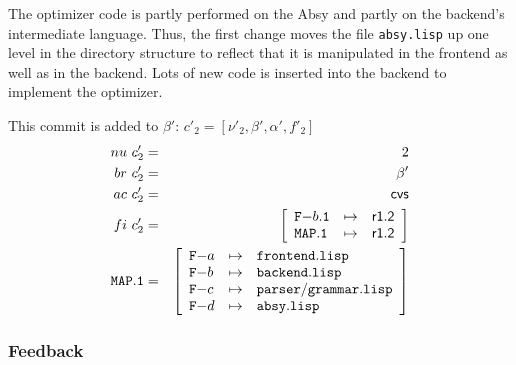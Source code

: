 \documentclass[fleqn, 10pt, a4paper]{article}
\begin{document}
The optimizer code is partly performed on the Absy and partly
on the backend's intermediate language. Thus, the first change
moves the file \texttt{absy.lisp} up one level in the directory
structure to reflect that it is manipulated in the frontend
as well as in the backend. Lots of new code is inserted into
the backend to implement the optimizer.

This commit is added to $\beta'$: $c'_2=[\nu'_2, \beta', \alpha', f'_2]$
\begin{eqnarray*}
\mathnormal{nu}\ c'_2 &=& 2 \\
\mathnormal{br}\ c'_2 &=& \beta' \\
\mathnormal{ac}\ c'_2 &=& \mathsf{cvs} \\
\mathnormal{fi}\ c'_2 &=& \left[
\begin{array}{lcl}
\mathtt{F-}b\mathtt{.1} & \mapsto & \mathsf{r1.2} \\
\mathtt{MAP.1}         & \mapsto & \mathsf{r1.2} \\
\end{array}\right] \\
\mathtt{MAP.1} &=& \left[
\begin{array}{lcl}
\mathtt{F-}a &\mapsto& \mathtt{frontend.lisp} \\
\mathtt{F-}b &\mapsto& \mathtt{backend.lisp} \\
\mathtt{F-}c &\mapsto& \mathtt{parser/grammar.lisp} \\
\mathtt{F-}d &\mapsto& \mathtt{absy.lisp} \\
\end{array}\right]
\end{eqnarray*}

\subsubsection{Feedback}
\end{document}
